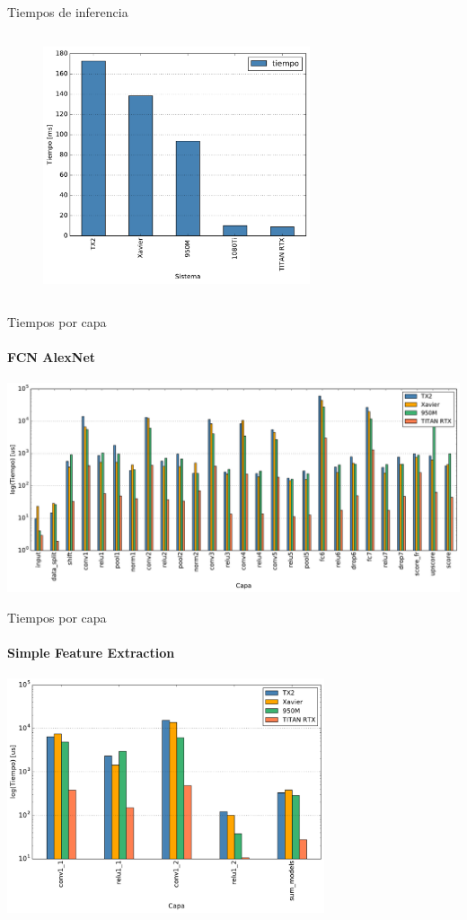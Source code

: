 \begin{frame}{Tiempos de inferencia}
\begin{columns}
	\begin{figure}[H]
	\centering
 \includegraphics[width=0.7\textwidth]{barplot/avg-fire.pdf}
	\end{figure}
	\end{columns}
 
\end{frame}





\begin{frame}{Tiempos por capa}
\framesubtitle{FCN AlexNet}
	\centering
 \includegraphics[width=1\textwidth]{barplot/layers-alex.pdf}

\end{frame}

\begin{frame}{Tiempos por capa}
\framesubtitle{Simple Feature Extraction}
	\centering
 \includegraphics[width=0.7\textwidth]{barplot/layers-sfe.pdf}

\end{frame}



